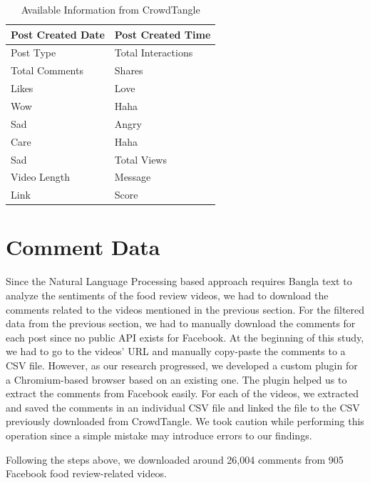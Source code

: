 \begin{table}
    \begin{center}
        \begin{tabular}{|l|l|}
        \hline
            Post Created Date   & Post Created Time     \\ \hline
            Post Type           & Total Interactions    \\ \hline
            Total Comments      & Shares                \\ \hline
            Likes               & Love                  \\ \hline
            Wow                 & Haha                  \\ \hline
            Sad                 & Angry                 \\ \hline
            Care                & Haha                  \\ \hline
            Sad                 & Total Views           \\ \hline
            Video Length        & Message               \\ \hline
            Link                & Score                 \\ \hline
        \end{tabular}
        \caption{Available Information from CrowdTangle}
        \label{table_crowdtangle_data}
    \end{center}
\end{table}


\section{Comment Data}

Since the Natural Language Processing based approach requires Bangla text to analyze the sentiments of the food review videos, we had to download the comments related to the videos mentioned in the previous section. For the filtered data from the previous section, we had to manually download the comments for each post since no public API exists for Facebook. At the beginning of this study, we had to go to the videos' URL and manually copy-paste the comments to a CSV file. However, as our research progressed, we developed a custom plugin for a Chromium-based browser based on an existing one. The plugin helped us to extract the comments from Facebook easily. For each of the videos, we extracted and saved the comments in an individual CSV file and linked the file to the CSV previously downloaded from CrowdTangle. We took caution while performing this operation since a simple mistake may introduce errors to our findings.

Following the steps above, we downloaded around 26,004 comments from 905 Facebook food review-related videos.


